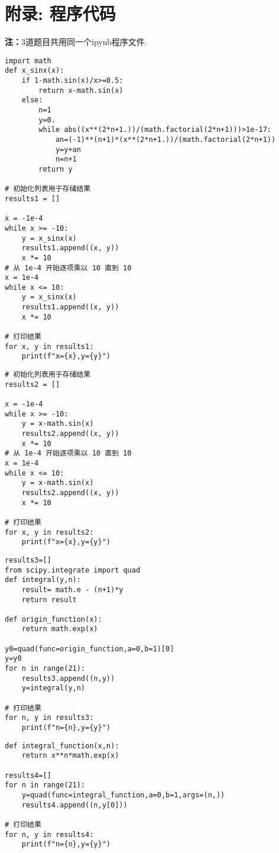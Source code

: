 \documentclass[UTF8,ctexart,a4paper,11pt,openany]{article}
\theoremstyle{definition}
\newcommand*{\rmk}{\textbf{注：}}
\begin{document}
\clearpage

\section{附录: 程序代码}
\rmk $3$道题目共用同一个ipynb程序文件.

\begin{lstlisting}[aboveskip=0pt]
import math
def x_sinx(x):
    if 1-math.sin(x)/x>=0.5:
        return x-math.sin(x)
    else:
        n=1
        y=0.
        while abs((x**(2*n+1.))/(math.factorial(2*n+1)))>1e-17:
            an=(-1)**(n+1)*(x**(2*n+1.))/(math.factorial(2*n+1))
            y=y+an
            n=n+1
        return y

# 初始化列表用于存储结果
results1 = []

x = -1e-4
while x >= -10:
    y = x_sinx(x)
    results1.append((x, y))
    x *= 10
# 从 1e-4 开始逐项乘以 10 直到 10
x = 1e-4
while x <= 10:
    y = x_sinx(x)
    results1.append((x, y))
    x *= 10

# 打印结果
for x, y in results1:
    print(f"x={x},y={y}")    
\end{lstlisting}
\begin{lstlisting}[aboveskip=0pt]
# 初始化列表用于存储结果
results2 = []

x = -1e-4
while x >= -10:
    y = x-math.sin(x)
    results2.append((x, y))
    x *= 10
# 从 1e-4 开始逐项乘以 10 直到 10
x = 1e-4
while x <= 10:
    y = x-math.sin(x)
    results2.append((x, y))
    x *= 10

# 打印结果
for x, y in results2:
    print(f"x={x},y={y}")
\end{lstlisting}
\begin{lstlisting}[aboveskip=0pt]
results3=[]
from scipy.integrate import quad
def integral(y,n):
    result= math.e - (n+1)*y
    return result

def origin_function(x):
    return math.exp(x)

y0=quad(func=origin_function,a=0,b=1)[0]
y=y0
for n in range(21):
    results3.append((n,y))
    y=integral(y,n)

# 打印结果
for n, y in results3:
    print(f"n={n},y={y}")
\end{lstlisting}
\begin{lstlisting}[aboveskip=0pt]
def integral_function(x,n):
    return x**n*math.exp(x)

results4=[]
for n in range(21):
    y=quad(func=integral_function,a=0,b=1,args=(n,))
    results4.append((n,y[0]))

# 打印结果
for n, y in results4:
    print(f"n={n},y={y}")
\end{lstlisting}
\end{document}
